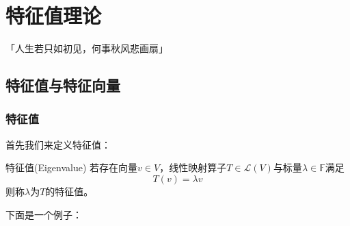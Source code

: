 \chapter{特征值理论}
\begin{center}
	「人生若只如初见，何事秋风悲画扇」
\end{center}
\vspace{-5pt}
\begin{center}
\end{center}

\section{特征值与特征向量}

\subsection{特征值}

首先我们来定义特征值：

\begin{definition}{特征值(Eigenvalue)}
	若存在向量$v\in V$，线性映射算子$T\in \mathcal{L}(V)$与标量$\lambda \in \mathbb{F}$满足$$T(v)=\lambda v$$则称$\lambda$为$T$的特征值。
\end{definition}

下面是一个例子：

